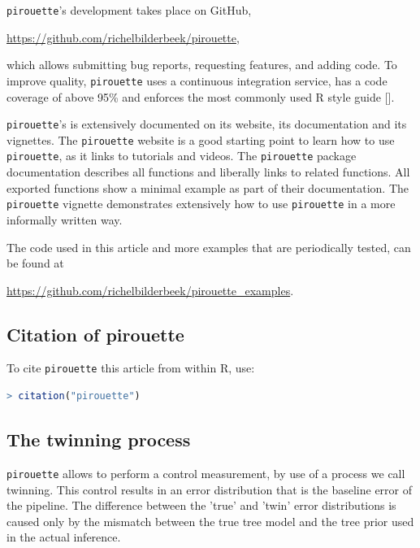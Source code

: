 \verb;pirouette;'s development takes place on GitHub,
\begin{sloppypar}
  \url{https://github.com/richelbilderbeek/pirouette},
\end{sloppypar}
which allows submitting bug reports, requesting features, 
and adding code. To improve quality, \verb;pirouette; 
uses a continuous integration service, has a code coverage of above 95\%
and enforces the most commonly used R style guide [\cite{style_guide}].

\verb;pirouette;'s is extensively documented on its website,
its documentation and its vignettes.
The \verb;pirouette; website is a good starting point to learn
how to use \verb;pirouette;, as it links to tutorials and videos.
The \verb;pirouette; package documentation describes
all functions and liberally links to related functions.
All exported functions show a minimal example as part of their documentation.
The \verb;pirouette; vignette demonstrates extensively how 
to use \verb;pirouette; in a more informally written way. 

The code used in this article and more examples that are periodically 
tested, can be found at
\begin{sloppypar}
  \url{https://github.com/richelbilderbeek/pirouette_examples}. 
\end{sloppypar}

\subsection{Citation of pirouette}
\label{subsec:citation}

To cite \verb;pirouette; this article from within R, use:

\begin{lstlisting}[language=R]
> citation("pirouette")
\end{lstlisting}


\subsection{The twinning process}
\label{subsec:twinning}

\verb;pirouette; allows to perform
a control measurement, by use of a process we call twinning. This control results in an error distribution
that is the baseline error of the pipeline. The difference
between the 'true' and 'twin' error distributions is caused only by the mismatch between the true tree model and the 
tree prior used in the actual inference.

